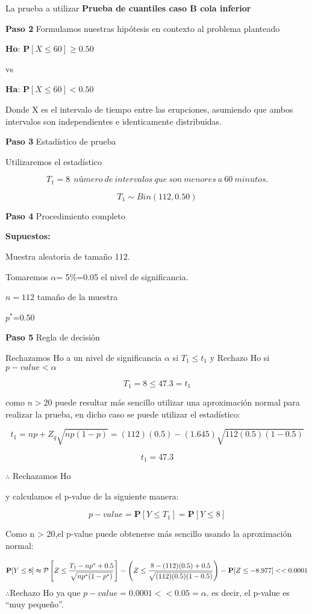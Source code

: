 \documentclass[a4paper,oneside,openany]{book}
\begin{document}
La prueba a utilizar \textbf{Prueba de cuantiles caso B cola inferior}

\textbf{Paso 2} Formulamos nuestras hipótesis en contexto al problema
planteado

\textbf{Ho}: \(\mathbf{P}[X \leq 60]\geq 0.50\)

vs

\textbf{Ha}: \(\mathbf{P}[X \leq 60]<0.50\)

Donde X es el intervalo de tiempo entre las erupciones, asumiendo que
ambos intervalos son independientes e identicamente distribuidas.

\textbf{Paso 3} Estadístico de prueba

Utilizaremos el estadístico

\[T_{1}=8 \ \ número \ de \ intervalos\ que \ son\ menores\ a\ 60\ minutos.\]

\[T_{1}\sim Bin(112,0.50)\]

\textbf{Paso 4} Procedimiento completo

\textbf{Supuestos:}

Muestra aleatoria de tamaño 112.

Tomaremos \(\alpha\)= 5\%=0.05 el nivel de significancia.

\(n=112\) tamaño de la muestra

\(p^*\)=0.50

\textbf{Paso 5} Regla de decisión

Rechazamos Ho a un nivel de significancia \(\alpha\) si
\(T_{1} \leq t_{1}\) y Rechazo Ho si \(p-value<\alpha\)

\[T_{1}=8 \leq 47.3=t_{1}\]

como \(n>20\) puede resultar más sencillo utilizar una aproximación
normal para realizar la prueba, en dicho caso se puede utilizar el
estadístico:

\[t_{1}=np+Z_{q}\sqrt{np(1-p)}=(112)(0.5)-(1.645)\sqrt{112(0.5)(1-0.5)}\]

\[t_{1}=47.3\]

\(\therefore\) Rechazamos Ho

y calculamos el p-value de la siguiente manera:

\[p-value= \mathbf{P}[Y\leq T_{1}]=\mathbf{P}[Y\leq 8]\]

Como n \textgreater{} 20,el p-value puede obtenerse más sencillo usando
la aproximación normal:

\[\mathbf{P}[Y\leq 8] \thickapprox \mathcal{P} \left[Z\leq\frac{T_{1}-np^*+0.5}{\sqrt{np^*(1-p^*)}}\right]=\left(Z\leq\frac{8-(112)(0.5)+0.5}{\sqrt{(112)(0.5)(1-0.5)}}\right)=\mathbf{P}[Z\leq -8.977] < < 0.0001\]
\(\therefore\)Rechazo Ho ya que \(p-value=0.0001<<0.05=\alpha.\) es
decir, el p-value es ``muy pequeño''.
\end{document}
